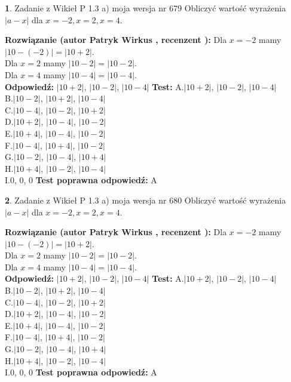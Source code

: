 \documentclass[12pt, a4paper]{article}
\theoremstyle{definition} %
\newtheorem{zad}{}
\newcommand{\zadStart}[1]{\begin{zad}#1\newline}
\newcommand{\zadStop}{\end{zad}}
\newcommand{\rozwStart}[2]{\noindent \textbf{Rozwiązanie (autor #1 , recenzent #2): }\newline}
\newcommand{\rozwStop}{\newline}
\newcommand{\odpStart}{\noindent \textbf{Odpowiedź:}\newline}
\newcommand{\odpStop}{\newline}
\newcommand{\testStart}{\noindent \textbf{Test:}\newline}
\newcommand{\testStop}{\newline}
\newcommand{\kluczStart}{\noindent \textbf{Test poprawna odpowiedź:}\newline}
\newcommand{\kluczStop}{\newline}
\begin{document}
\zadStart{Zadanie z Wikieł P 1.3 a) moja wersja nr 679}
Obliczyć wartość wyrażenia $|a - x|$ dla $x=-2,x=2,x=4$.
\zadStop
\rozwStart{Patryk Wirkus}{}
Dla $x = -2$ mamy $|10 - (-2)| = |10 + 2|$.\\
Dla $x = 2$ mamy $|10 - 2| = |10 - 2|$.\\
Dla $x = 4$ mamy $|10 - 4| = |10 - 4|$.\\
\rozwStop
\odpStart
$|10 + 2|$, $|10 - 2|$, $|10 - 4|$
\odpStop
\testStart
A.$|10 + 2|$, $|10 - 2|$, $|10 - 4|$\\
B.$|10 - 2|$, $|10 + 2|$, $|10 - 4|$\\
C.$|10 - 4|$, $|10 - 2|$, $|10 + 2|$\\
D.$|10 + 2|$, $|10 - 4|$, $|10 - 2|$\\
E.$|10 + 4|$, $|10 - 4|$, $|10 - 2|$\\
F.$|10 - 4|$, $|10 + 4|$, $|10 - 2|$\\
G.$|10 - 2|$, $|10 - 4|$, $|10 + 4|$\\
H.$|10 + 4|$, $|10 - 2|$, $|10 - 4|$\\
I.$0$, $0$, $0$
\testStop
\kluczStart
A
\kluczStop



\zadStart{Zadanie z Wikieł P 1.3 a) moja wersja nr 680}
Obliczyć wartość wyrażenia $|a - x|$ dla $x=-2,x=2,x=4$.
\zadStop
\rozwStart{Patryk Wirkus}{}
Dla $x = -2$ mamy $|10 - (-2)| = |10 + 2|$.\\
Dla $x = 2$ mamy $|10 - 2| = |10 - 2|$.\\
Dla $x = 4$ mamy $|10 - 4| = |10 - 4|$.\\
\rozwStop
\odpStart
$|10 + 2|$, $|10 - 2|$, $|10 - 4|$
\odpStop
\testStart
A.$|10 + 2|$, $|10 - 2|$, $|10 - 4|$\\
B.$|10 - 2|$, $|10 + 2|$, $|10 - 4|$\\
C.$|10 - 4|$, $|10 - 2|$, $|10 + 2|$\\
D.$|10 + 2|$, $|10 - 4|$, $|10 - 2|$\\
E.$|10 + 4|$, $|10 - 4|$, $|10 - 2|$\\
F.$|10 - 4|$, $|10 + 4|$, $|10 - 2|$\\
G.$|10 - 2|$, $|10 - 4|$, $|10 + 4|$\\
H.$|10 + 4|$, $|10 - 2|$, $|10 - 4|$\\
I.$0$, $0$, $0$
\testStop
\kluczStart
A
\kluczStop
\end{document}
